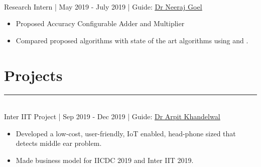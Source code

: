 \documentclass[]{resume}
\begin{document}
\begin{minipage}[t]{0.69\textwidth}
\vspace{-0.8em}
\hspace{0.5em}
\\
\hspace*{0.7em}Research Intern | May 2019 - July 2019 | Guide: \href{mailto: neeraj@iitrpr.ac.in }{\underline{Dr Neeraj Goel}}\\
\vspace{-2em}
\descript{}
\begin{itemize}
    \item Proposed Accuracy Configurable Adder and Multiplier
    \vspace{-0.6em}\\
    \item Compared proposed algorithms with state of the art algorithms using  and .
\end{itemize}
\sectionsep
\vspace{-1.7em}

\section{Projects}
\vspace{-0.5em}
\noindent\rule{13cm}{0.4pt}

\vspace{0.2em}
\hspace{0.5em}
\\
\hspace*{0.5em} Inter IIT Project | Sep 2019 - Dec 2019 | Guide: \href{mailto: arpitkhandelwal@iitj.ac.in }{\underline{Dr Arpit Khandelwal}}\\ 
\vspace{-2em}
\descript{}
\begin{itemize}
    \item Developed a low-cost, user-friendly, IoT enabled, head-phone sized  that detects middle ear problem.
    \vspace{-0.6em}\\
    \item Made business model for IICDC 2019 and Inter IIT 2019.
\end{itemize}
\sectionsep


\end{minipage}
\end{document}

